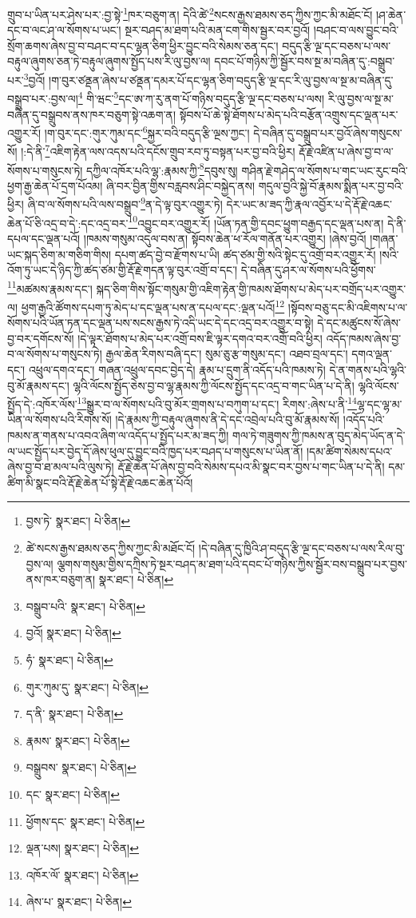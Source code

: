 གྲུབ་པ་ཡིན་པར་ཤེས་པར་:བྱ་སྟེ་\footnote{བྱས་ཏེ་  སྣར་ཐང་།  པེ་ཅིན། }ཁར་བཅུག་ན། དེའི་ཚེ་\footnote{ཚེ་སངས་རྒྱས་ཐམས་ཅད་ཀྱིས་ཀྱང་མི་མཐོང་ངོ། །དེ་བཞིན་དུ་ཁྱིའི་ཤ་བདུད་རྩི་ལྔ་དང་བཅས་པ་ལས་རིལ་བུ་བྱས་ལ། ལྕགས་གསུམ་གྱིས་དཀྲིས་ཏེ་སྔར་བཤད་མ་ཐག་པའི་དབང་པོ་གཉིས་ཀྱིས་སྦྱོར་བས་བསྒྲུབ་པར་བྱས་ནས་ཁར་བཅུག་ན།   སྣར་ཐང་།  པེ་ཅིན། }སངས་རྒྱས་ཐམས་ཅད་ཀྱིས་ཀྱང་མི་མཐོང་ངོ། །ཤ་ཆེན་དང་བ་ལང་ཤ་ལ་སོགས་པ་ཡང་། སྔར་བཤད་མ་ཐག་པའི་མན་ངག་གིས་སྦྱར་བར་བྱའོ། །བཤང་བ་ལས་བྱུང་བའི་སྲོག་ཆགས་ཞེས་བྱ་བ་བཤང་བ་དང་ལྷན་ཅིག་ཕྱིར་བྱུང་བའི་སེམས་ཅན་དང་། བདུད་རྩི་ལྔ་དང་བཅས་པ་ལས་བརྟུལ་ཞུགས་ཅན་ཏེ་བརྟུལ་ཞུགས་སྤྱོད་པས་རི་ལུ་བྱས་ལ། དབང་པོ་གཉིས་ཀྱི་སྦྱོར་བས་སྔ་མ་བཞིན་དུ་:བསྒྲུབ་པར་\footnote{བསྒྲུབ་པའི་  སྣར་ཐང་།  པེ་ཅིན། }བྱའོ། །ག་བུར་ཙནྡན་ཞེས་པ་ཙནྡན་དམར་པོ་དང་ལྷན་ཅིག་བདུད་རྩི་ལྔ་དང་རི་ལུ་བྱས་ལ་སྔ་མ་བཞིན་དུ་བསྒྲུབ་པར་:བྱས་ལ།\footnote{བྱའོ།  སྣར་ཐང་།  པེ་ཅིན། } གི་ཝང་\footnote{ཧཾ་  སྣར་ཐང་།  པེ་ཅིན། }དང་ཨ་ཀ་རུ་ནག་པོ་གཉིས་བདུད་རྩི་ལྔ་དང་བཅས་པ་ལས། རི་ལུ་བྱས་ལ་སྔ་མ་བཞིན་དུ་བསྒྲུབས་ནས་ཁར་བཅུག་སྟེ་འཆག་ན། སྟོབས་པོ་ཆེ་སྟེ་ཐོགས་པ་མེད་པའི་བརྩོན་འགྲུས་དང་ལྡན་པར་འགྱུར་རོ། །ག་བུར་དང་:གུར་ཀུམ་དང་\footnote{གུར་ཀུམ་དུ་  སྣར་ཐང་།  པེ་ཅིན། }སྐྱར་བའི་བདུད་རྩི་ལྔས་ཀྱང་། དེ་བཞིན་དུ་བསྒྲུབ་པར་བྱའོ་ཞེས་གསུངས་སོ། །:དེ་ནི་\footnote{ད་ནི་  སྣར་ཐང་།  པེ་ཅིན། }འཇིག་རྟེན་ལས་འདས་པའི་དངོས་གྲུབ་རབ་ཏུ་བསྟན་པར་བྱ་བའི་ཕྱིར། རྡོ་རྗེ་འཛིན་པ་ཞེས་བྱ་བ་ལ་སོགས་པ་གསུངས་ཏེ། དཀྱིལ་འཁོར་པའི་ལྷ་:རྣམས་ཀྱི་\footnote{རྣམས་  སྣར་ཐང་།  པེ་ཅིན། }དབུས་སུ། གཤིན་རྗེ་གཤེད་ལ་སོགས་པ་གང་ཡང་རུང་བའི་ཕྱག་རྒྱ་ཆེན་པོ་དྲག་པོའམ། ཞི་བར་བྱིན་གྱིས་བརླབས་ཤིང་བསྐྱེད་ནས། གདུལ་བྱའི་སྐྱེ་བོ་རྣམས་སྨིན་པར་བྱ་བའི་ཕྱིར། ཞི་བ་ལ་སོགས་པའི་ལས་བསྒྲུབ་\footnote{བསྒྲུབས་  སྣར་ཐང་།  པེ་ཅིན། }ན་དེ་ལྟ་བུར་འགྱུར་ཏེ། དེར་ཡང་མ་ཟད་ཀྱི་རྣལ་འབྱོར་པ་དེ་རྡོ་རྗེ་འཆང་ཆེན་པོ་ཅི་འདྲ་བ་དེ་:དང་འདྲ་བར་\footnote{དང་  སྣར་ཐང་།  པེ་ཅིན། }འབྱུང་བར་འགྱུར་རོ། །ཡོན་ཏན་གྱི་དབང་ཕྱུག་བརྒྱད་དང་ལྡན་པས་ན། དེ་ནི་དཔལ་དང་ལྡན་པའོ། །ཁམས་གསུམ་འདུལ་བས་ན། སྟོབས་ཆེན་ཕ་རོལ་གནོན་པར་འགྱུར། །ཞེས་བྱའོ། །གཞན་ཡང་སྐད་ཅིག་མ་གཅིག་གིས། དཔག་ཚད་བྱེ་བ་རྫོགས་པ་ཡི། ཚད་ཙམ་གྱི་སའི་སྟེང་དུ་འགྲོ་བར་འགྱུར་རོ། །སའི་འོག་ཏུ་ཡང་དེ་ཉིད་ཀྱི་ཚད་ཙམ་གྱི་རྡོ་རྗེ་གདན་ལྟ་བུར་འགྲོ་བ་དང་། དེ་བཞིན་དུ་ཤར་ལ་སོགས་པའི་ཕྱོགས་\footnote{ཕྱོགས་དང་  སྣར་ཐང་།  པེ་ཅིན། }མཚམས་རྣམས་དང་། སྐད་ཅིག་གིས་སྟོང་གསུམ་གྱི་འཇིག་རྟེན་གྱི་ཁམས་ཐོགས་པ་མེད་པར་བགྲོད་པར་འགྱུར་ལ། ཕྱག་རྒྱའི་ཚོགས་དཔག་ཏུ་མེད་པ་དང་ལྡན་པས་ན་དཔལ་དང་:ལྡན་པའོ།\footnote{ལྡན་པས།  སྣར་ཐང་།  པེ་ཅིན། } །སྟོབས་བཅུ་དང་མི་འཇིགས་པ་ལ་སོགས་པའི་ཡོན་ཏན་དང་ལྡན་པས་སངས་རྒྱས་ཏེ་འདི་ཡང་དེ་དང་འདྲ་བར་འགྱུར་བ་སྟེ། དེ་དང་མཚུངས་སོ་ཞེས་བྱ་བར་དགོངས་སོ། །དེ་ལྟར་ཐོགས་པ་མེད་པར་འགྲོ་བས་ཇི་ལྟར་དགའ་བར་འགྲོ་བའི་ཕྱིར། འདོད་ཁམས་ཞེས་བྱ་བ་ལ་སོགས་པ་གསུངས་ཏེ། རྒྱལ་ཆེན་རིགས་བཞི་དང་། སུམ་ཅུ་རྩ་གསུམ་དང་། འཐབ་བྲལ་དང་། དགའ་ལྡན་དང་། འཕྲུལ་དགའ་དང་། གཞན་འཕྲུལ་དབང་བྱེད་དེ། རྣམ་པ་དྲུག་ནི་འདོད་པའི་ཁམས་ཏེ། དེ་ན་གནས་པའི་ལྷའི་བུ་མོ་རྣམས་དང་། ལྷའི་ལོངས་སྤྱོད་ཅེས་བྱ་བ་ལྷ་རྣམས་ཀྱི་ལོངས་སྤྱོད་དང་འདྲ་བ་གང་ཡིན་པ་དེ་ནི། ལྷའི་ལོངས་སྤྱོད་དེ་:འཁོར་ལོས་\footnote{འཁོར་ལོ་  སྣར་ཐང་།  པེ་ཅིན། }སྒྱུར་བ་ལ་སོགས་པའི་བུ་མོར་གྲགས་པ་བཀུག་པ་དང་། རིགས་:ཞེས་པ་ནི་\footnote{ཞེས་པ་  སྣར་ཐང་།  པེ་ཅིན། }ལྷ་དང་ལྷ་མ་ཡིན་ལ་སོགས་པའི་རིགས་སོ། །དེ་རྣམས་ཀྱི་བརྟུལ་ཞུགས་ནི་དེ་དང་འབྲེལ་པའི་བུ་མོ་རྣམས་སོ། །འདོད་པའི་ཁམས་ན་གནས་པ་འབའ་ཞིག་ལ་འདོད་པ་སྤྱོད་པར་མ་ཟད་ཀྱི། གལ་ཏེ་གཟུགས་ཀྱི་ཁམས་ན་བུད་མེད་ཡོད་ན་དེ་ལ་ཡང་སྤྱོད་པར་བྱེད་དོ་ཞེས་ཕུལ་དུ་བྱུང་བའི་ཁྱད་པར་བཤད་པ་གསུངས་པ་ཡིན་ནོ། །དམ་ཚིག་སེམས་དཔའ་ཞེས་བྱ་བ་ཐ་མལ་པའི་ལུས་ཏེ། རྡོ་རྗེ་ཆེན་པོ་ཞེས་བྱ་བའི་སེམས་དཔའ་མི་སྣང་བར་བྱས་པ་གང་ཡིན་པ་དེ་ནི། དམ་ཚིག་མི་སྣང་བའི་རྡོ་རྗེ་ཆེན་པོ་སྟེ་རྡོ་རྗེ་འཆང་ཆེན་པོའོ། 